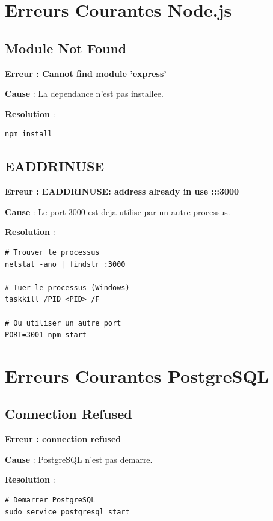 \documentclass[a4paper,12pt]{book}
\begin{document}
\section{Erreurs Courantes Node.js}

\subsection{Module Not Found}

\begin{errorbox}
    \textbf{Erreur : Cannot find module 'express'}

    \textbf{Cause} : La dependance n'est pas installee.

    \textbf{Resolution} :
    \begin{lstlisting}[style=bash]
npm install
    \end{lstlisting}
\end{errorbox}

\subsection{EADDRINUSE}

\begin{errorbox}
    \textbf{Erreur : EADDRINUSE: address already in use :::3000}

    \textbf{Cause} : Le port 3000 est deja utilise par un autre processus.

    \textbf{Resolution} :
    \begin{lstlisting}[style=bash]
# Trouver le processus
netstat -ano | findstr :3000

# Tuer le processus (Windows)
taskkill /PID <PID> /F

# Ou utiliser un autre port
PORT=3001 npm start
    \end{lstlisting}
\end{errorbox}

\section{Erreurs Courantes PostgreSQL}

\subsection{Connection Refused}

\begin{errorbox}
    \textbf{Erreur : connection refused}

    \textbf{Cause} : PostgreSQL n'est pas demarre.

    \textbf{Resolution} :
    \begin{lstlisting}[style=bash]
# Demarrer PostgreSQL
sudo service postgresql start
    \end{lstlisting}
\end{errorbox}
\end{document}
